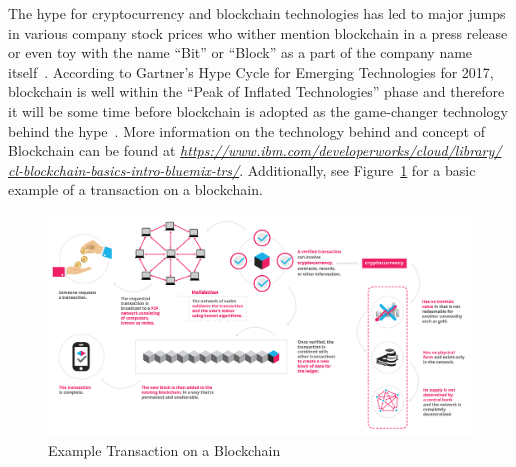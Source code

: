 The hype for cryptocurrency and blockchain technologies has led to major jumps
in various company stock prices who wither mention blockchain in a press
release or even toy with the name ``Bit'' or ``Block'' as a part of the company
name itself~\cite{ReutersKodak}. According to Gartner's Hype Cycle for Emerging
Technologies for 2017, blockchain is well within the ``Peak of Inflated
Technologies'' phase and therefore it will be some time before blockchain is
adopted as the game-changer technology behind the
hype~\cite{GartnerHypeTechnology2017}. More information on the technology
behind and concept of Blockchain can be found at
\textit{\url{https://www.ibm.com/developerworks/cloud/library/
cl-blockchain-basics-intro-bluemix-trs/}}.
Additionally, see Figure~\ref{f:blockchainpng} for a basic example of a
transaction on a blockchain.

\begin{figure}[!ht]
  \centering\includegraphics[width=\columnwidth]
{../images/blockchainbasics.png}
  \caption{Example Transaction on a Blockchain~\cite{BlockchainImage}}
\label{f:blockchainpng}
\end{figure}

